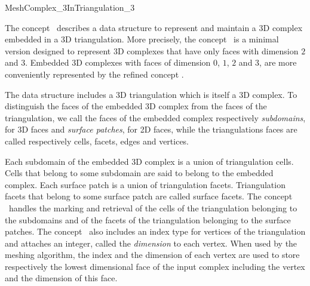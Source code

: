 \ccRefPageBegin


\begin{ccRefConcept}{MeshComplex_3InTriangulation_3}


\ccDefinition

The concept \ccRefName\ describes a data structure 
to represent and maintain a 3D complex embedded in a 3D triangulation.
More precisely, the concept \ccRefName\  is a minimal version
designed to represent 
3D complexes that have only faces with dimension $2$ and $3$.
Embedded 3D  complexes with faces of dimension $0$, $1$, $2$ and $3$,
are more conveniently represented by the refined concept
.


The data structure includes a 3D triangulation which is itself a 3D complex.
To distinguish the faces of the embedded 3D complex from the
faces of the triangulation, we call  the faces of the embedded complex
respectively  {\em subdomains}, for 3D faces
and {\em surface patches}, for 2D faces,
while  the triangulations faces  are called respectively
cells, facets, edges and vertices.

Each subdomain of the embedded 3D complex is a union of 
triangulation cells. Cells that belong to some subdomain are said to belong
to the embedded complex.
 Each surface patch  is a union of 
triangulation facets. Triangulation facets that belong to some
surface patch are called surface facets. 
The concept \ccRefName\  handles the  marking and retrieval of the 
cells of the triangulation belonging to the subdomains
and  of the facets of the triangulation belonging to the surface patches.
The concept \ccRefName\  also  includes an index type  for vertices of the triangulation
and attaches an integer, called the {\em dimension} to each vertex.
When used by the meshing algorithm, 
the index and the dimension  of each vertex  are used to store respectively
the lowest dimensional face of the input complex including the vertex
and the dimension of this face.




\end{ccRefConcept}
